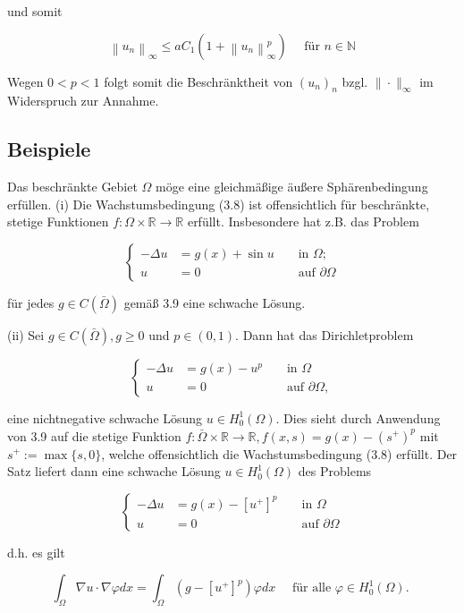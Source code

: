 \documentclass[10pt, letterpaper]{article}
\begin{document}
und somit

$$
\left\|u_{n}\right\|_{\infty} \leq a C_{1}\left(1+\left\|u_{n}\right\|_{\infty}^{p}\right) \quad \text { für } n \in \mathbb{N}
$$

Wegen $0<p<1$ folgt somit die Beschränktheit von $\left(u_{n}\right)_{n}$ bzgl. $\|\cdot\|_{\infty}$ im Widerspruch zur Annahme.

\subsection*{Beispiele}

Das beschränkte Gebiet $\Omega$ möge eine gleichmäßige äußere Sphärenbedingung erfüllen.
(i) Die Wachstumsbedingung (3.8) ist offensichtlich für beschränkte, stetige Funktionen $f: \Omega \times \mathbb{R} \rightarrow \mathbb{R}$ erfüllt. Insbesondere hat z.B. das Problem

$$
\left\{\begin{aligned}
-\Delta u & =g(x)+\sin u & & \text { in } \Omega ; \\
u & =0 & & \text { auf } \partial \Omega
\end{aligned}\right.
$$

für jedes $g \in C(\bar{\Omega})$ gemäß 3.9 eine schwache Lösung.

(ii) Sei $g \in C(\bar{\Omega}), g \geq 0$ und $p \in(0,1)$. Dann hat das Dirichletproblem

$$
\left\{\begin{aligned}
-\Delta u & =g(x)-u^{p} & & \text { in } \Omega \\
u & =0 & & \text { auf } \partial \Omega,
\end{aligned}\right.
$$

eine nichtnegative schwache Lösung $u \in H_{0}^{1}(\Omega)$. Dies sieht durch Anwendung von 3.9 auf die stetige Funktion $f: \bar{\Omega} \times \mathbb{R} \rightarrow \mathbb{R}, f(x, s)=g(x)-\left(s^{+}\right)^{p}$ mit $s^{+}:=\max \{s, 0\}$, welche offensichtlich die Wachstumsbedingung (3.8) erfüllt. Der Satz liefert dann eine schwache Lösung $u \in H_{0}^{1}(\Omega)$ des Problems

$$
\left\{\begin{aligned}
-\Delta u & =g(x)-\left[u^{+}\right]^{p} & & \text { in } \Omega \\
u & =0 & & \text { auf } \partial \Omega
\end{aligned}\right.
$$

d.h. es gilt

$$
\int_{\Omega} \nabla u \cdot \nabla \varphi d x=\int_{\Omega}\left(g-\left[u^{+}\right]^{p}\right) \varphi d x \quad \text { für alle } \varphi \in H_{0}^{1}(\Omega) \text {. }
$$
\end{document}
